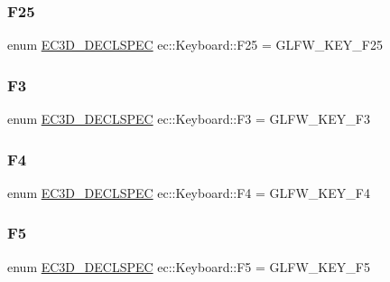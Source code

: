 \subsubsection{\texorpdfstring{F25}{F25}}
{\footnotesize\ttfamily enum \mbox{\hyperlink{_common_8h_aac42573e202ca3dd4d259c81691e2369}{E\+C3\+D\+\_\+\+D\+E\+C\+L\+S\+P\+EC}} ec\+::\+Keyboard\+::\+F25 = G\+L\+F\+W\+\_\+\+K\+E\+Y\+\_\+\+F25}

\mbox{\label{classec_1_1_keyboard_a3002ddc8f37c24a1429e22d5dc8e48aa}} 
\subsubsection{\texorpdfstring{F3}{F3}}
{\footnotesize\ttfamily enum \mbox{\hyperlink{_common_8h_aac42573e202ca3dd4d259c81691e2369}{E\+C3\+D\+\_\+\+D\+E\+C\+L\+S\+P\+EC}} ec\+::\+Keyboard\+::\+F3 = G\+L\+F\+W\+\_\+\+K\+E\+Y\+\_\+\+F3}

\mbox{\label{classec_1_1_keyboard_ad1f7f78c96c7a59a21210d94e693fde7}} 
\subsubsection{\texorpdfstring{F4}{F4}}
{\footnotesize\ttfamily enum \mbox{\hyperlink{_common_8h_aac42573e202ca3dd4d259c81691e2369}{E\+C3\+D\+\_\+\+D\+E\+C\+L\+S\+P\+EC}} ec\+::\+Keyboard\+::\+F4 = G\+L\+F\+W\+\_\+\+K\+E\+Y\+\_\+\+F4}

\mbox{\label{classec_1_1_keyboard_a7a9bd546b5eeba38a587303293246bb7}} 
\subsubsection{\texorpdfstring{F5}{F5}}
{\footnotesize\ttfamily enum \mbox{\hyperlink{_common_8h_aac42573e202ca3dd4d259c81691e2369}{E\+C3\+D\+\_\+\+D\+E\+C\+L\+S\+P\+EC}} ec\+::\+Keyboard\+::\+F5 = G\+L\+F\+W\+\_\+\+K\+E\+Y\+\_\+\+F5}

\mbox{\label{classec_1_1_keyboard_a02fe21453cf1fd9a9c5f181ec9a8f714}} 
